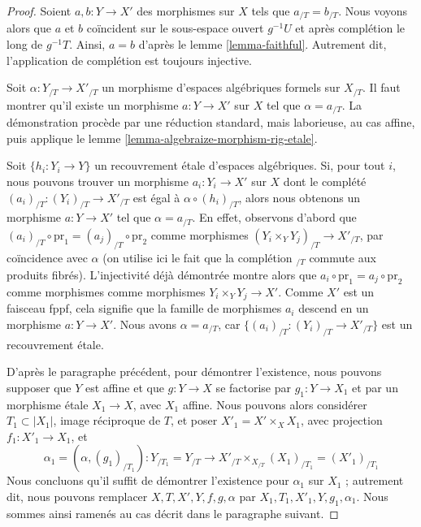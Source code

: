 \begin{proof}
Soient $a, b : Y \to X'$ des morphismes sur $X$ tels que
$a_{/T} = b_{/T}$. Nous voyons alors que $a$ et $b$ coïncident sur le
sous-espace ouvert $g^{-1}U$ et après complétion le long de $g^{-1}T$.
Ainsi, $a = b$ d'après le lemme \ref{lemma-faithful}.
Autrement dit, l'application de complétion est toujours injective.

\medskip\noindent
Soit $\alpha : Y_{/T} \to X'_{/T}$ un morphisme d'espaces algébriques
formels sur $X_{/T}$. Il faut montrer qu'il existe un morphisme
$a : Y \to X'$ sur $X$ tel que $\alpha = a_{/T}$. La démonstration procède
par une réduction standard, mais laborieuse, au cas affine, puis applique le
lemme \ref{lemma-algebraize-morphism-rig-etale}.

\medskip\noindent
Soit $\{h_i : Y_i \to Y\}$ un recouvrement étale d'espaces algébriques.
Si, pour tout $i$, nous pouvons trouver un morphisme $a_i : Y_i \to X'$
sur $X$ dont le complété $(a_i)_{/T} : (Y_i)_{/T} \to X'_{/T}$ est égal à
$\alpha \circ (h_i)_{/T}$, alors nous obtenons un morphisme $a : Y \to X'$
tel que $\alpha = a_{/T}$. En effet, observons d'abord que
$(a_i)_{/T} \circ \text{pr}_1 = (a_j)_{/T} \circ \text{pr}_2$
comme morphismes $(Y_i \times_Y Y_j)_{/T} \to X'_{/T}$, par coïncidence
avec $\alpha$ (on utilise ici le fait que la complétion ${}_{/T}$ commute
aux produits fibrés). L'injectivité déjà démontrée montre alors que
$a_i \circ \text{pr}_1 = a_j \circ \text{pr}_2$ comme morphismes
comme morphismes $Y_i \times_Y Y_j \to X'$. Comme $X'$ est un faisceau
fppf, cela signifie que la famille de morphismes $a_i$ descend en un
morphisme $a : Y \to X'$. Nous avons $\alpha = a_{/T}$, car
$\{(a_i)_{/T} : (Y_i)_{/T} \to X'_{/T}\}$ est un recouvrement étale.

\medskip\noindent
D'après le paragraphe précédent, pour démontrer l'existence, nous pouvons
supposer que $Y$ est affine et que $g : Y \to X$ se factorise par
$g_1 : Y \to X_1$ et par un morphisme étale $X_1 \to X$, avec $X_1$ affine.
Nous pouvons alors considérer $T_1 \subset |X_1|$, image réciproque de $T$,
et poser $X'_1 = X' \times_X X_1$, avec projection $f_1 : X'_1 \to X_1$, et
$$
\alpha_1 = (\alpha, (g_1)_{/T_1}) :
Y_{/T_1} = Y_{/T}
\longrightarrow
X'_{/T} \times_{X_{/T}} (X_1)_{/T_1} = (X'_1)_{/T_1}
$$
Nous concluons qu'il suffit de démontrer l'existence pour $\alpha_1$
sur $X_1$ ; autrement dit, nous pouvons remplacer $X, T, X', Y, f, g, \alpha$
par $X_1, T_1, X'_1, Y, g_1, \alpha_1$.
Nous sommes ainsi ramenés au cas décrit dans le paragraphe suivant.


\end{proof}
